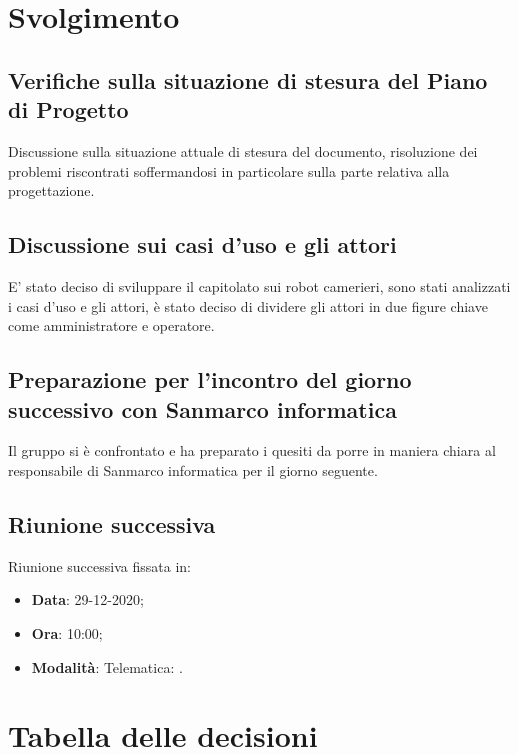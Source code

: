\documentclass[]{article}
\begin{document}
	\newpage

	\section{Svolgimento}
		\subsection{Verifiche sulla situazione di stesura del Piano di Progetto}
		Discussione sulla situazione attuale di stesura del documento, risoluzione dei problemi riscontrati soffermandosi in particolare sulla parte relativa alla progettazione.\\

		\subsection{Discussione sui casi d'uso e gli attori }
		E' stato deciso di sviluppare il capitolato sui robot camerieri, sono stati analizzati i casi d'uso e gli attori, è stato deciso di dividere gli attori in due figure chiave come amministratore e operatore.\\
		
		\subsection{Preparazione per l'incontro del giorno successivo con Sanmarco informatica}
		Il gruppo si è confrontato e ha preparato i quesiti da porre in maniera chiara al responsabile di Sanmarco informatica per il giorno seguente.\\

		\subsection{Riunione successiva}
		Riunione successiva fissata in:
		\begin{itemize}
			\item \textbf{Data}: 29-12-2020;
			\item \textbf{Ora}: 10:00;
			\item \textbf{Modalità}: Telematica: .
		\end{itemize}
	
	\newpage
	
	\section{Tabella delle decisioni}
	
\end{document}
